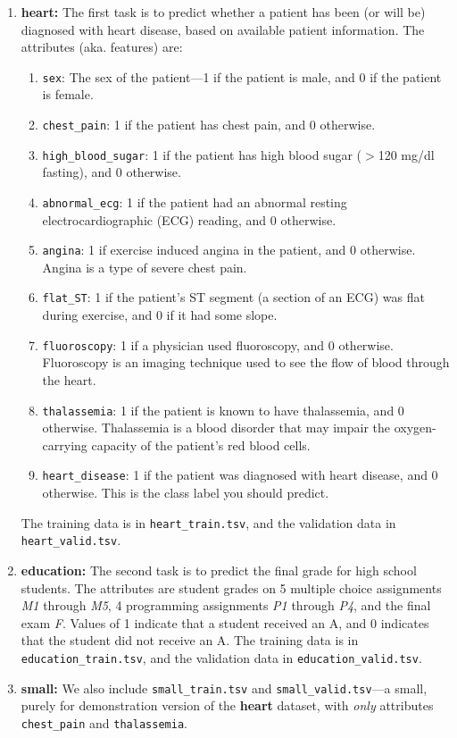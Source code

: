 \begin{enumerate}
\item \textbf{heart:}
    The first task is to predict whether a patient has been (or will be) diagnosed with heart disease, based on available patient information. The attributes (aka. features) are: 
    \begin{enumerate}
        \item \lstinline{sex}: The sex of the patient---1 if the patient is male, and 0 if the patient is female.
        \item \lstinline{chest_pain}: 1 if the patient has chest pain, and 0 otherwise.
        \item \lstinline{high_blood_sugar}: 1 if the patient has high blood sugar ($>$120 mg/dl fasting), and 0 otherwise.
        \item \lstinline{abnormal_ecg}: 1 if the patient had an abnormal resting electrocardiographic (ECG) reading, and 0 otherwise. 
        \item \lstinline{angina}: 1 if exercise induced angina in the patient, and 0 otherwise. Angina is a type of severe chest pain.
        \item \lstinline{flat_ST}: 1 if the patient's ST segment (a section of an ECG) was flat during exercise, and 0 if it had some slope.
        \item \lstinline{fluoroscopy}: 1 if a physician used fluoroscopy, and 0 otherwise. Fluoroscopy is an imaging technique used to see the flow of blood through the heart.
        \item \lstinline{thalassemia}: 1 if the patient is known to have thalassemia, and 0 otherwise. Thalassemia is a blood disorder that may impair the oxygen-carrying capacity of the patient's red blood cells.
        \item \lstinline{heart_disease}: 1 if the patient was diagnosed with heart disease, and 0 otherwise. This is the class label you should predict.
    \end{enumerate}
    The training data is in \lstinline{heart_train.tsv}, and the validation data in \lstinline{heart_valid.tsv}.
\item \textbf{education:}
    The second task is to predict the final grade for high school students. The attributes are student grades on 5 multiple choice assignments \emph{M1} through \emph{M5}, 4 programming assignments \emph{P1} through \emph{P4}, and the final exam \emph{F}. Values of 1 indicate that a student received an A, and 0 indicates that the student did not receive an A. The training data is in \newline \lstinline{education_train.tsv}, and the validation data in \lstinline{education_valid.tsv}.
\item \textbf{small:}
    We also include \lstinline{small_train.tsv} and \lstinline{small_valid.tsv}---a small, purely for demonstration version of the \textbf{heart} dataset, with \emph{only} attributes \lstinline{chest_pain} and \lstinline{thalassemia}.  

\end{enumerate}




